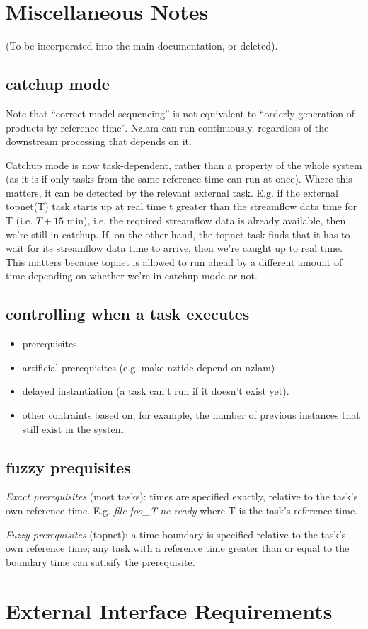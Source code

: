 \documentclass[11pt,a4paper]{article}
\begin{document}
\section{Miscellaneous Notes}

(To be incorporated into the main documentation, or deleted).

\subsection{catchup mode}

Note that ``correct model sequencing'' is not equivalent to ``orderly
generation of products by reference time''.  Nzlam can run continuously,
regardless of the downstream processing that depends on it.

Catchup mode is now task-dependent, rather than a property of the whole
system (as it is if only tasks from the same reference time can run at
once).  Where this matters, it can be detected by the relevant external
task. E.g. if the external topnet(T) task starts up at real time t
greater than the streamflow data time for T (i.e. $T+15$ min), i.e. the
required streamflow data is already available, then we're still in
catchup. If, on the other hand, the topnet task finds that it has to
wait for its streamflow data time to arrive, then we're caught up to
real time.  This matters because topnet is allowed to run ahead by a
different amount of time depending on whether we're in catchup mode or
not.


\subsection{controlling when a task executes}

\begin{itemize}
 \item  prerequisites
 \item artificial prerequisites (e.g. make nztide depend on nzlam)
 \item delayed instantiation (a task can't run if it doesn't exist yet).
 \item other contraints based on, for example, the number of previous
 instances that still exist in the system.
\end{itemize}


\subsection{fuzzy prequisites}

{\em Exact prerequisites} (most tasks): times are specified exactly,
relative to the task's own reference time.  E.g. {\em file foo\_{T}.nc
ready} where T is the task's reference time.

{\em Fuzzy prerequisites} (topnet): a time boundary is specified
relative to the task's own reference time; any task with a reference
time greater than or equal to the boundary time can satisify the
prerequisite.

\section{External Interface Requirements}
\end{document}
